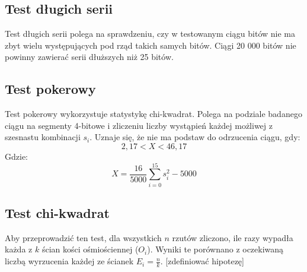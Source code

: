 \subsection{Test długich serii}
Test długich serii polega na sprawdzeniu, czy w testowanym ciągu bitów nie ma zbyt wielu występujących pod rząd takich 
samych bitów. Ciągi 20 000 bitów nie powinny zawierać serii dłuższych niż 25 bitów.

\subsection{Test pokerowy}
Test pokerowy wykorzystuje statystykę chi-kwadrat. Polega na podziale badanego ciągu na segmenty 4-bitowe i zliczeniu
liczby wystąpień każdej możliwej z szesnastu kombinacji \begin{math}s_i\end{math}. Uznaje się, że nie ma podstaw do 
odrzucenia ciągu, gdy:
\begin{displaymath}
    2,17 < X < 46,17
\end{displaymath}
Gdzie:
\begin{displaymath}
    X = \frac{16}{5000} \sum^{15}_{i=0} s_i^2 - 5000
\end{displaymath}







\subsection{Test chi-kwadrat}
Aby przeprowadzić ten test, dla wszystkich \begin{math} n \end{math} rzutów zliczono, ile razy wypadła każda z 
\begin{math} k \end{math} ścian kości ośmiościennej (\begin{math}O_i\end{math}). Wyniki te porównano z oczekiwaną
liczbą wyrzucenia każdej ze ścianek \begin{math}E_i = \frac{n}{k}\end{math}.
[zdefiniować hipotezę]


